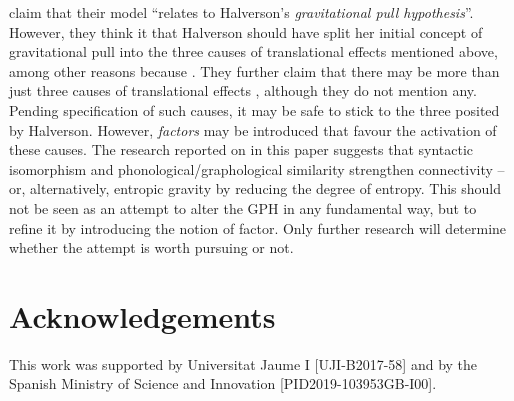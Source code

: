 \documentclass[output=paper,english,spanish,german,english]{langsci/langscibook}
\begin{document}
\citet[226]{caretal19} claim that their model \enquote{relates to Halverson’s \parencite*{halverson03} \textit{gravitational pull hypothesis}}. However, they think it  that Halverson should have split her initial concept of gravitational pull into the three causes of translational effects mentioned above, among other reasons because . They further claim that there may be more than just three causes of translational effects \parencite[227]{caretal19}, although they do not mention any. Pending specification of such causes, it may be safe to stick to the three posited by Halverson. However, \textit{factors} may be introduced that favour the activation of these causes. The research reported on in this paper suggests that syntactic isomorphism and phonological\slash graphological similarity strengthen connectivity -- or, alternatively, entropic gravity by reducing the degree of entropy. This should not be seen as an attempt to alter the GPH in any fundamental way, but to refine it by introducing the notion of factor. Only further research will determine whether the attempt is worth pursuing or not.

\section*{Acknowledgements}

This work was supported by Universitat Jaume I [UJI-B2017-58] and by the Spanish Ministry of Science and Innovation [PID2019-103953GB-I00].

{\sloppy\printbibliography[heading=subbibliography,notkeyword=this]}
\end{document}
